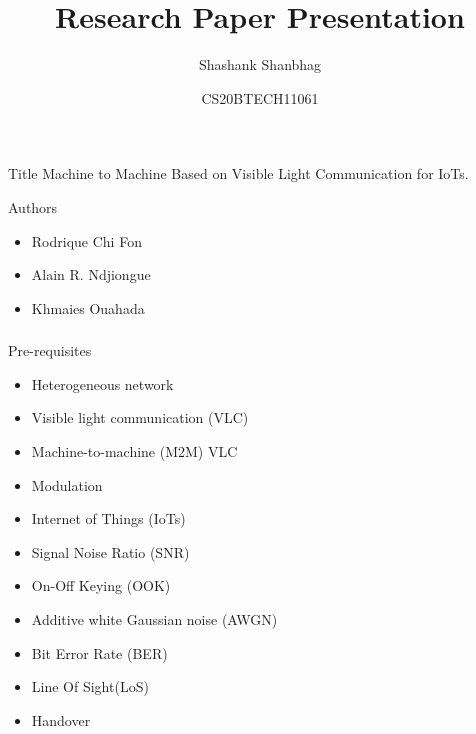 \documentclass{beamer}
\title{Research Paper Presentation}
\author{Shashank Shanbhag}
\date{CS20BTECH11061}
\begin{document}
\begin{frame}
\titlepage
\end{frame}

\begin{frame}
    \begin{block}{Title}
    Machine to Machine Based on Visible Light Communication for IoTs.
    \end{block}
    \begin{block}{Authors}
    \begin{itemize}
        \item Rodrique Chi Fon
        \item Alain R. Ndjiongue
        \item Khmaies Ouahada
    \end{itemize}
    \end{block}
\end{frame}

\begin{frame}
  \frametitle{}
  \begin{block}{Pre-requisites}
    \begin{itemize}
        \item Heterogeneous network 
        \item Visible light communication (VLC)  
        \item Machine-to-machine (M2M) VLC
        \item Modulation
        \item Internet of Things (IoTs)
        \item Signal Noise Ratio (SNR)
        \item On-Off Keying (OOK) 
        \item Additive white Gaussian noise (AWGN)
        \item Bit Error Rate (BER)
        \item Line Of Sight(LoS)
        \item Handover
    \end{itemize}
  \end{block}
\end{frame}
\end{document}
